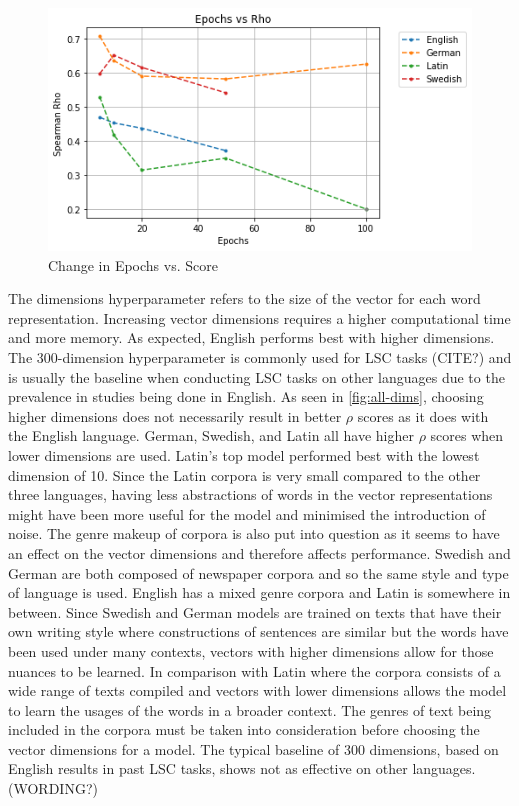 \begin{figure}[h]
  \centering
  \includegraphics[width=.8\linewidth]{sections/figures/epochs_all.png}
  \caption{Change in Epochs vs. Score}
  \label{fig:all-epochs}
\end{figure}

The dimensions hyperparameter refers to the size of the vector for each word representation. Increasing vector dimensions requires a higher computational time and more memory. As expected, English performs best with higher dimensions. The 300-dimension hyperparameter is commonly used for LSC tasks (CITE?) and is usually the baseline when conducting LSC tasks on other languages due to the prevalence in studies being done in English. As seen in \autoref{fig:all-dims}, choosing higher dimensions does not necessarily result in better $\rho$ scores as it does with the English language. German, Swedish, and Latin all have higher $\rho$ scores when lower dimensions are used. Latin’s top model performed best with the lowest dimension of 10. Since the Latin corpora is very small compared to the other three languages, having less abstractions of words in the vector representations might have been more useful for the model and minimised the introduction of noise. The genre makeup of corpora is also put into question as it seems to have an effect on the vector dimensions and therefore affects performance. Swedish and German are both composed of newspaper corpora and so the same style and type of language is used. English has a mixed genre corpora and Latin is somewhere in between. Since Swedish and German models are trained on texts that have their own writing style where constructions of sentences are similar but the words have been used under many contexts, vectors with higher dimensions allow for those nuances to be learned. In comparison with Latin where the corpora consists of a wide range of texts compiled and vectors with lower dimensions allows the model to learn the usages of the words in a broader context. The genres of text being included in the corpora must be taken into consideration before choosing the vector dimensions for a model. The typical baseline of 300 dimensions, based on English results in past LSC tasks, shows not as effective on other languages. (WORDING?)

